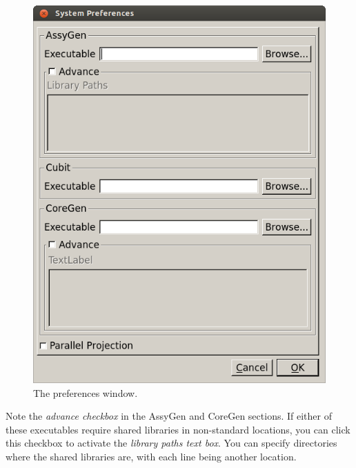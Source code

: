 \begin{figure}[H]
	\begin{center}
		\includegraphics[width=0.5\linewidth]{Images/mesh-2.png}
		\caption{The preferences window.}
		\label{fig:Mesh2}
	\end{center}
\end{figure}

Note the \emph{advance checkbox} in the AssyGen and CoreGen sections.  If either of these executables require shared libraries in non-standard locations, you can click this checkbox to activate the \emph{library paths text box}.  You can specify directories where the shared libraries are, with each line being another location.